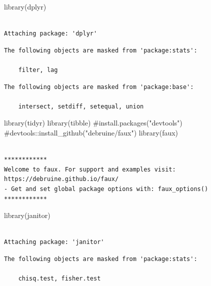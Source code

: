 \documentclass[
  letterpaper,
  DIV=11,
  numbers=noendperiod]{scrreprt}
\newenvironment{Shaded}{\begin{snugshade}}{\end{snugshade}}
\newcommand{\CommentTok}[1]{\textcolor[rgb]{0.37,0.37,0.37}{#1}}
\newcommand{\FunctionTok}[1]{\textcolor[rgb]{0.28,0.35,0.67}{#1}}
\newcommand{\NormalTok}[1]{\textcolor[rgb]{0.00,0.23,0.31}{#1}}
\begin{document}
\begin{Shaded}
\begin{Highlighting}[]
\FunctionTok{library}\NormalTok{(dplyr)}
\end{Highlighting}
\end{Shaded}

\begin{verbatim}

Attaching package: 'dplyr'
\end{verbatim}

\begin{verbatim}
The following objects are masked from 'package:stats':

    filter, lag
\end{verbatim}

\begin{verbatim}
The following objects are masked from 'package:base':

    intersect, setdiff, setequal, union
\end{verbatim}

\begin{Shaded}
\begin{Highlighting}[]
\FunctionTok{library}\NormalTok{(tidyr)}
\FunctionTok{library}\NormalTok{(tibble)}
\CommentTok{\#install.packages("devtools")}
\CommentTok{\#devtools::install\_github("debruine/faux")}
\FunctionTok{library}\NormalTok{(faux)}
\end{Highlighting}
\end{Shaded}

\begin{verbatim}

************
Welcome to faux. For support and examples visit:
https://debruine.github.io/faux/
- Get and set global package options with: faux_options()
************
\end{verbatim}

\begin{Shaded}
\begin{Highlighting}[]
\FunctionTok{library}\NormalTok{(janitor)}
\end{Highlighting}
\end{Shaded}

\begin{verbatim}

Attaching package: 'janitor'
\end{verbatim}

\begin{verbatim}
The following objects are masked from 'package:stats':

    chisq.test, fisher.test
\end{verbatim}
\end{document}
